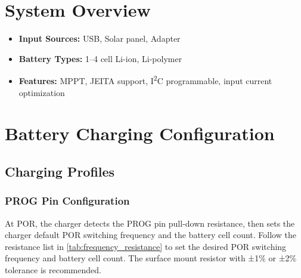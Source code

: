 \documentclass[12pt]{article}
\begin{document}

\section{System Overview}
\begin{itemize}
  \item \textbf{Input Sources:} USB, Solar panel, Adapter
  \item \textbf{Battery Types:} 1–4 cell Li-ion, Li-polymer
  \item \textbf{Features:} MPPT, JEITA support, I\textsuperscript{2}C programmable, input current optimization
\end{itemize}


\section{Battery Charging Configuration}

\subsection{Charging Profiles}

\subsubsection{PROG Pin Configuration}
At POR, the charger detects the PROG pin pull-down resistance, then sets the charger default POR switching
frequency and the battery cell count. Follow the resistance list in \autoref{tab:frequency_resistance} to set the desired
POR switching frequency and battery cell count. The surface mount resistor with ±1\% or ±2\% tolerance is
recommended.
\end{document}
